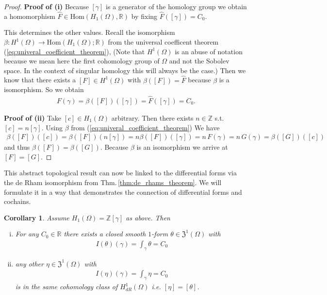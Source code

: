 \documentclass[12pt,a4paper]{article}
\numberwithin{equation}{subsection}
\numberwithin{lemma}{subsection}
\newtheorem{corollary}[lemma]{Corollary}
\theoremstyle{definition}
\newcommand{\integers}{\mathbb{Z}}
\newcommand{\real}{\mathbb{R}}
\begin{document}
\begin{proof}
    \textbf{Proof of (i)} %
    Because $[\gamma]$ is a generator of the homology group we  obtain a 
    homomorphism $\hat{F} \in \text{Hom}(H_1(\Omega),\real)$ by fixing
    $\hat{F}([\gamma]) = C_0$. 
    
    This determines the other values.
    Recall the isomorphism $\beta : H^1(\Omega) \rightarrow 
    \text{Hom}(H_1(\Omega);\real)$ from the universal coefficent theorem 
    (\ref{eq:univeral_coefficient_theorem}), 
    (Note that $H^1(\Omega)$ is an abuse of notation 
    because we mean here the first cohomology group of $\Omega$ and not the 
    Sobolev space. In the context of singular homology this will always be the
    case.)
    Then we know that there exists
    a $[F] \in H^1(\Omega)$ with $\beta([F]) = \hat{F}$ because $\beta$ is a 
    isomorphism. So we obtain
    \begin{align*}
        F(\gamma) = \beta([F])([\gamma]) = \hat{F}([\gamma]) = C_0.
    \end{align*}

    \textbf{Proof of (ii)} %
    Take $[c] \in H_1(\Omega)$ arbitrary. 
    Then there exists  $n \in \integers$ s.t.
    $[c] = n [\gamma]$.
    Using $\beta$ from (\ref{eq:univeral_coefficient_theorem})
    We have
    \begin{align*}
        \beta([F])([c]) = \beta([F])(n [\gamma]) 
        = n \beta([F])([\gamma]) = n \, F(\gamma) = n \, G(\gamma) = 
        \beta([G])([c])
    \end{align*}
    and thus $\beta([F]) = \beta([G])$. Because $\beta$ is an isomorphism
    we arrive at $[F] = [G]$.
\end{proof}
This abstract topological result can now be linked to the differential 
forms via the de Rham isomorphism from Thm.\,\ref{thm:de_rhams_theorem}. 
We will formulate it in a way 
that demonstrates the connection of differential forms and cochains.
\begin{corollary}\label{cor:existence_uniqueness_1form}
    Assume $H_1(\Omega) = \integers [\gamma]$ as above. Then
    \begin{enumerate}[(i)]
        \item For any $C_0 \in \real$ there exists a closed smooth $1$-form 
            $\theta \in \mathfrak{Z}^1(\Omega)$ with 
            \begin{align*}
                I(\theta)(\gamma) = \int_\gamma \theta = C_0
            \end{align*}
        \item any other $\eta \in \mathfrak{Z}^1(\Omega)$ with 
            \begin{align*}
                I(\eta)(\gamma) = \int_\gamma \eta = C_0
            \end{align*}
            is in the same cohomology class of $H_{dR}^1(\Omega)$ 
            i.e. $[\eta] = [\theta]$.
    \end{enumerate}
\end{corollary}
\end{document}
